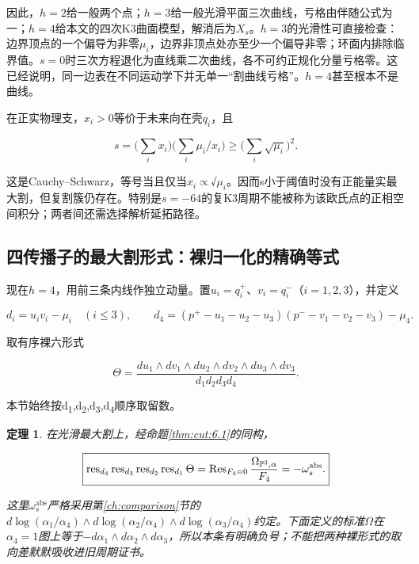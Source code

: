 \documentclass[11pt,a4paper,oneside]{ctexart}
\theoremstyle{cnplain}
\newtheorem{theorem}{定理}[section]
\theoremstyle{definition}
\theoremstyle{remark}
\numberwithin{equation}{section}
\begin{document}
因此，\(h=2\)给一般两个点；\(h=3\)给一般光滑平面三次曲线，亏格由伴随公式为一；\(h=4\)给本文的四次K3曲面模型，解消后为\(X_s\)。\(h=3\)的光滑性可直接检查：边界顶点的一个偏导为非零\(\mu _i\)，边界非顶点处亦至少一个偏导非零；环面内排除临界值。\(s=0\)时三次方程退化为直线乘二次曲线，各不可约正规化分量亏格零。这已经说明，同一边表在不同运动学下并无单一``割曲线亏格''。\(h=4\)甚至根本不是曲线。

在正实物理支，\(x_i>0\)等价于未来向在壳\(q_i\)，且

\begin{equation}
s=\Big(\sum_i x_i\Big)\Big(\sum_i\mu_i/x_i\Big)
          \geq\Big(\sum_i\sqrt{\mu_i}\Big)^2.          \label{eq:cut:6.4}
\end{equation}

这是Cauchy--Schwarz，等号当且仅当\(x_i\propto \)√\(\mu _i\)。因而s小于阈值时没有正能量实最大割，但复割簇仍存在。特别是\(s=- 64\)的复K3周期不能被称为该欧氏点的正相空间积分；两者间还需选择解析延拓路径。


\subsection{四传播子的最大割形式：裸归一化的精确等式}\label{sec:cut:7}

现在\(h=4\)，用前三条内线作独立动量。置\(u_i=q_i^+\)、\(v_i=q_i^-\)（\(i=1,2,3\)），并定义

\begin{equation}
d_i=u_iv_i-\mu_i\quad(i\leq3),\qquad
 d_4=(p^+-u_1-u_2-u_3)(p^--v_1-v_2-v_3)-\mu_4.
\end{equation}

取有序裸六形式

\begin{equation}
\Theta=\frac{du_1\wedge dv_1\wedge du_2\wedge dv_2
                          \wedge du_3\wedge dv_3}
                         {d_1d_2d_3d_4}.              \label{eq:cut:7.1}
\end{equation}

本节始终按d\textsubscript{1},d\textsubscript{2},d\textsubscript{3},d\textsubscript{4}顺序取留数。

\begin{theorem}

\label{thm:cut:7.1} 在光滑最大割上，经命题\ref{thm:cut:6.1}的同构，

\begin{equation}
\boxed{\operatorname{res}_{d_4}\operatorname{res}_{d_3}
 \operatorname{res}_{d_2}\operatorname{res}_{d_1}\Theta
       =\operatorname{Res}_{F_4=0}
                     \frac{\Omega_{\mathbb P^3,\alpha}}{F_4}
       =-\omega_s^{\rm abs}.}
                                                               \label{eq:cut:7.2}
\end{equation}

这里\(\omega _s^{\mathrm{abs}}\)严格采用第\ref{ch:comparison}节的\(d\log (\alpha _{1}/\alpha _{4})\wedge d\log (\alpha _{2}/\alpha _{4})\wedge d\log (\alpha _{3}/\alpha _{4})\)约定。下面定义的标准\(\Omega \)在\(\alpha _{4}=1\)图上等于\(- d\alpha _{1}\wedge d\alpha _{2}\wedge d\alpha _{3}\)，所以本条有明确负号；不能把两种裸形式的取向差默默吸收进旧周期证书。

\end{theorem}
\end{document}
